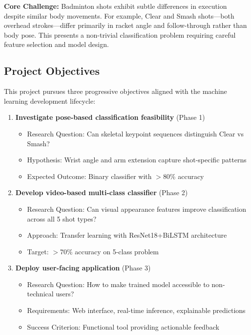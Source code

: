 \documentclass[11pt,a4paper]{article}
\begin{document}
\textbf{Core Challenge:} Badminton shots exhibit subtle differences in execution despite similar body movements. For example, Clear and Smash shots---both overhead strokes---differ primarily in racket angle and follow-through rather than body pose. This presents a non-trivial classification problem requiring careful feature selection and model design.

\subsection{Project Objectives}

This project pursues three progressive objectives aligned with the machine learning development lifecycle:

\begin{enumerate}[label=\textbf{Objective \arabic*:}]
\item \textbf{Investigate pose-based classification feasibility} (Phase 1)
   \begin{itemize}
   \item Research Question: Can skeletal keypoint sequences distinguish Clear vs Smash?
   \item Hypothesis: Wrist angle and arm extension capture shot-specific patterns
   \item Expected Outcome: Binary classifier with $>$80\% accuracy
   \end{itemize}

\item \textbf{Develop video-based multi-class classifier} (Phase 2)
   \begin{itemize}
   \item Research Question: Can visual appearance features improve classification across all 5 shot types?
   \item Approach: Transfer learning with ResNet18+BiLSTM architecture
   \item Target: $>$70\% accuracy on 5-class problem
   \end{itemize}

\item \textbf{Deploy user-facing application} (Phase 3)
   \begin{itemize}
   \item Research Question: How to make trained model accessible to non-technical users?
   \item Requirements: Web interface, real-time inference, explainable predictions
   \item Success Criterion: Functional tool providing actionable feedback
   \end{itemize}
\end{enumerate}
\end{document}
